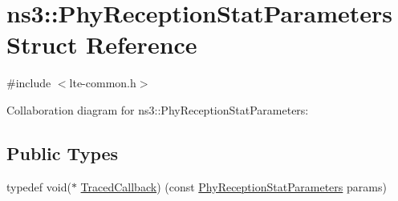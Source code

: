 \hypertarget{structns3_1_1PhyReceptionStatParameters}{}\section{ns3\+:\+:Phy\+Reception\+Stat\+Parameters Struct Reference}
\label{structns3_1_1PhyReceptionStatParameters}


{\ttfamily \#include $<$lte-\/common.\+h$>$}



Collaboration diagram for ns3\+:\+:Phy\+Reception\+Stat\+Parameters\+:
\subsection*{Public Types}
\begin{DoxyCompactItemize}
\item 
typedef void($\ast$ \hyperlink{structns3_1_1PhyReceptionStatParameters_a5d088f40469543164effe500ad341cd3}{Traced\+Callback}) (const \hyperlink{structns3_1_1PhyReceptionStatParameters}{Phy\+Reception\+Stat\+Parameters} params)
\end{DoxyCompactItemize}
